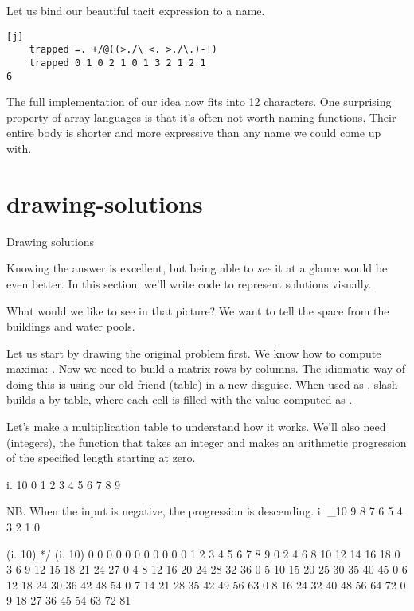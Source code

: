 \documentclass{article}
\begin{document}
Let us bind our beautiful tacit expression to a name.

\begin{verbatim}[j]
    trapped =. +/@((>./\ <. >./\.)-])
    trapped 0 1 0 2 1 0 1 3 2 1 2 1
6
\end{verbatim}

The full implementation of our idea now fits into 12  characters.
One surprising property of array languages is that it's often not worth naming functions.
Their entire body is shorter and more expressive than any name we could come up with.

\section{drawing-solutions}{Drawing solutions}

Knowing the answer is excellent, but being able to \emph{see} it at a glance would be even better.
In this section, we'll write code to represent solutions visually.

What would we like to see in that picture?
We want to tell the space from the buildings and water pools.

Let us start by drawing the original problem first.
We know how to compute maxima: .
Now we need to build a matrix  rows by  columns.
The idiomatic way of doing this is using our old friend \href{https://code.jsoftware.com/wiki/Vocabulary/slash#dyadic}{\code{/} (table)} in a new disguise. 
When used as , slash builds a  by  table, where each cell  is filled with the value computed as .

Let's make a multiplication table to understand how it works.
We'll also need \href{https://code.jsoftware.com/wiki/Vocabulary/idot}{ (integers)}, the function that takes an integer and makes an arithmetic progression of the specified length starting at zero.

\begin{code}[j]
    i. 10
0 1 2 3 4 5 6 7 8 9

    NB. When the input is negative, the progression is descending.
    i. _10
9 8 7 6 5 4 3 2 1 0

    (i. 10) */ (i. 10)
0 0  0  0  0  0  0  0  0  0
0 1  2  3  4  5  6  7  8  9
0 2  4  6  8 10 12 14 16 18
0 3  6  9 12 15 18 21 24 27
0 4  8 12 16 20 24 28 32 36
0 5 10 15 20 25 30 35 40 45
0 6 12 18 24 30 36 42 48 54
0 7 14 21 28 35 42 49 56 63
0 8 16 24 32 40 48 56 64 72
0 9 18 27 36 45 54 63 72 81
\end{code}
\end{document}
